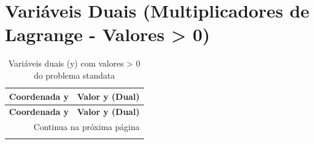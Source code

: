 \documentclass[12pt]{article}
\begin{document}
\section{Variáveis Duais (Multiplicadores de Lagrange - Valores > 0)}

\begin{longtable}{@{}cc@{}}
\caption{Variáveis duais (y) com valores > 0 do problema standata} \\
\toprule
\textbf{Coordenada y} & \textbf{Valor y (Dual)} \\
\midrule
\endfirsthead

\toprule
\textbf{Coordenada y} & \textbf{Valor y (Dual)} \\
\midrule
\endhead

\midrule \multicolumn{2}{r}{{Continua na próxima página}} \\ \midrule
\endfoot


\end{longtable}
\end{document}
